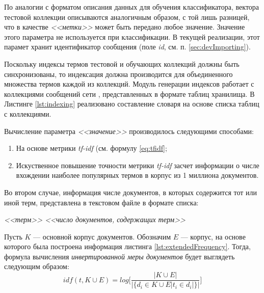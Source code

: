     По аналогии с форматом описания данных для обучения классификатора, вектора
    тестовой коллекции описываются аналогичным образом, с той лишь разницей, что
    в качестве {\it <<метки>>} может быть передано любое значение.
    Значение этого параметра не используется при классификации.
    В текущей реализации, этот парамет хранит идентификатор сообщения (поле
    {\it id}, см. п. \ref{sec:devImporting}).

    Поскольку индексы термов тестовой и обучающих коллекций должны быть
    синхронизованы, то индексация должна производится для объединенного
    множества термов каждой из коллекций.
    Модуль генерации индексов работает с коллекциями сообщений сети \twitter,
    представленных в формате таблиц хранилища. В Листинге \ref{lst:indexing}
    реализовано составление словаря на основе списка таблиц с коллекциями.

    \lstset{style=python}
    

    Вычисление параметра {\it <<значение>>} производилось следующими способами:
    \begin{enumerate}
        \item На основе метрики {\it tf-idf} (см. формулу \ref{eq:tfidf};
        \item Искуственное повышение точности метрики {\it tf-idf} засчет информации о числе
            вхождении наиболее популярных термов в корпус из 1 миллиона документов.
    \end{enumerate}

    Во втором случае, информация числе документов, в которых содержится тот или
    иной терм, представлена в текстовом файле в формате списка:
    \begin{center}
        \it
        <<терм>> <<число документов, содержащих терм>>
    \end{center}

    Пусть $K$ --- основной корпус документов.
    Обозначим $E$ --- корпус, на основе которого была построена информация листинга
    \ref{lst:extendedFrequency}.
    Тогда, формула вычисления {\it инвертированной меры документов} будет выглядеть
    следующим образом:
    \begin{equation}
        idf(t, K \cup E) = log \Bigg[ \dfrac{|K \cup E|}{|\{d_i \in K \cup E | t_i \in d_i|\}|} \Bigg]
    \end{equation}

